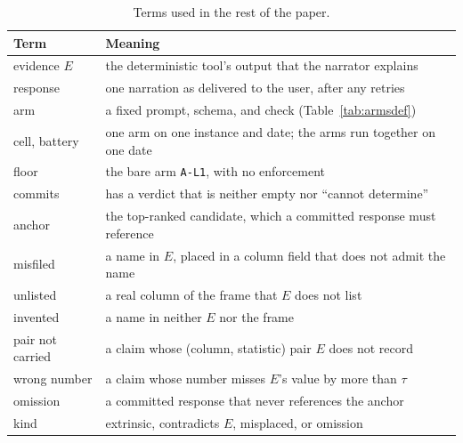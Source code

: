 \documentclass[10pt,twocolumn]{article}
\begin{document}
\begin{table}[!htbp]
\caption{Terms used in the rest of the paper.}
\label{tab:terms}
\centering
\footnotesize
\setlength{\tabcolsep}{3pt}
\begin{tabular}{@{}lp{6.1cm}@{}}
\toprule
Term & Meaning \\
\midrule
evidence $E$ & the deterministic tool's output that the narrator explains \\
response & one narration as delivered to the user, after any retries \\
arm & a fixed prompt, schema, and check (Table~\ref{tab:armsdef}) \\
cell, battery & one arm on one instance and date; the arms run together on one date \\
floor & the bare arm \texttt{A-L1}, with no enforcement \\
commits & has a verdict that is neither empty nor ``cannot determine'' \\
anchor & the top-ranked candidate, which a committed response must reference \\
misfiled & a name in $E$, placed in a column field that does not admit the name \\
unlisted & a real column of the frame that $E$ does not list \\
invented & a name in neither $E$ nor the frame \\
pair not carried & a claim whose (column, statistic) pair $E$ does not record \\
wrong number & a claim whose number misses $E$'s value by more than $\tau$ \\
omission & a committed response that never references the anchor \\
kind & extrinsic, contradicts $E$, misplaced, or omission \\
\bottomrule
\end{tabular}
\end{table}
\end{document}
